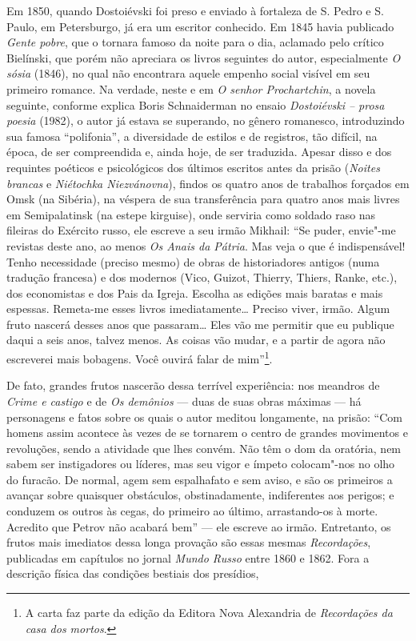 Em 1850, quando Dostoiévski foi preso e enviado à fortaleza de S. Pedro
e S. Paulo, em Petersburgo, já era um escritor conhecido. Em 1845 havia
publicado \emph{Gente pobre}, que o tornara famoso da noite para o dia,
aclamado pelo crítico Bielínski, que porém não apreciara os livros
seguintes do autor, especialmente \emph{O sósia} (1846), no qual não
encontrara aquele empenho social visível em seu primeiro romance. Na
verdade, neste e em \emph{O senhor Prochartchin}, a novela seguinte,
conforme explica Boris Schnaiderman no ensaio \emph{Dostoiévski -- prosa
poesia} (1982), o autor já estava se superando, no gênero romanesco,
introduzindo sua famosa ``polifonia'', a diversidade de estilos e de
registros, tão difícil, na época, de ser compreendida e, ainda hoje, de
ser traduzida. Apesar disso e dos requintes poéticos e psicológicos dos
últimos escritos antes da prisão (\emph{Noites brancas} e \emph{Niétochka
Niezvánovna}), findos os quatro anos de trabalhos forçados em Omsk (na
Sibéria), na véspera de sua transferência para quatro anos mais livres
em Semipalatinsk (na estepe kirguise), onde serviria como soldado raso
nas fileiras do Exército russo, ele escreve a seu irmão Mikhail: ``Se puder, envie"-me revistas deste ano, ao menos
\emph{Os Anais da Pátria}. Mas veja o que é indispensável! Tenho
necessidade (preciso mesmo) de obras de historiadores antigos (numa
tradução francesa) e dos modernos (Vico, Guizot, Thierry, Thiers, Ranke,
etc.), dos economistas e dos Pais da Igreja. Escolha as edições mais
baratas e mais espessas. Remeta-me esses livros imediatamente\ldots{} Preciso
viver, irmão. Algum fruto nascerá desses anos que passaram\ldots{} Eles vão
me permitir que eu publique daqui a seis anos, talvez menos. As coisas
vão mudar, e a partir de agora não escreverei mais bobagens. Você ouvirá
falar de mim''\footnote{A carta faz parte da edição da Editora Nova Alexandria de \emph{Recordações da
casa dos mortos}.}. 

De fato, grandes frutos nascerão dessa terrível
experiência: nos meandros de \emph{Crime e castigo} e de \emph{Os
demônios} --- duas de suas obras máximas --- há personagens e fatos sobre
os quais o autor meditou longamente, na prisão: ``Com homens assim
acontece às vezes de se tornarem o centro de grandes movimentos e
revoluções, sendo a atividade que lhes convém. Não têm o dom da
oratória, nem sabem ser instigadores ou líderes, mas seu vigor e ímpeto
colocam"-nos no olho do furacão. De normal, agem sem espalhafato e sem
aviso, e são os primeiros a avançar sobre quaisquer obstáculos,
obstinadamente, indiferentes aos perigos; e conduzem os outros às cegas,
do primeiro ao último, arrastando-os à morte. Acredito que Petrov não
acabará bem'' --- ele escreve ao irmão. Entretanto, os frutos mais
imediatos dessa longa provação são essas mesmas \emph{Recordações},
publicadas em capítulos no jornal \emph{Mundo Russo} entre 1860 e 1862.
Fora a descrição física das condições bestiais dos presídios,


